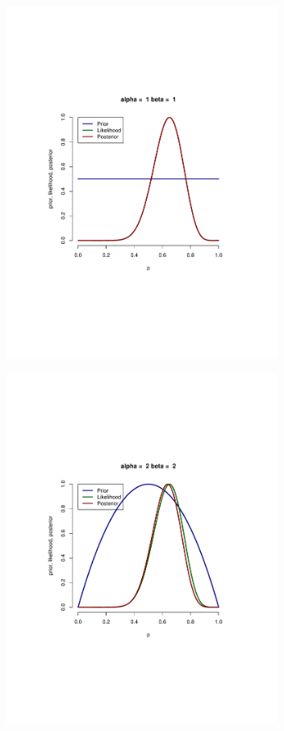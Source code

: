 \documentclass[aspectratio=169]{beamer}
\begin{document}
\begin{frame}
\includegraphics[width=3.5in]{binBayes2.pdf}
\end{frame}

\begin{frame}
\includegraphics[width=3.5in]{binBayes3.pdf}
\end{frame}
\end{document}
